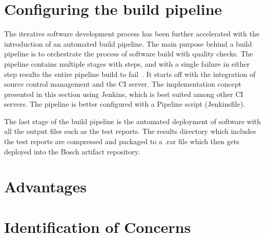 \section{Configuring the build pipeline}\label{section:CICDpipeline}

The iterative software development process has been further accelerated  with the introduction of an automated build pipeline. The main purpose behind a build pipeline is to orchestrate the process of software build with quality checks. The pipeline contains multiple stages with steps, and with a single failure in either step results the entire pipeline build to fail~\parencite{soni2015end}.  It starts off with the integration of source control management and the CI server. The implementation concept presented in this section using Jenkins, which is best suited among other CI servers. The pipeline is better configured with a Pipeline script (Jenkinsfile).


The last stage of the build pipeline is the automated deployment of software with all the output files such as the test reports. The results directory which includes the test reports are compressed and packaged to a .rar file which then gets deployed into the Bosch artifact repository.



\section{Advantages}\label{section:AdvantagesCICDpipeline}


\section{Identification of Concerns}\label{section:ConcernsCICDpipeline}




\clearpage\null\thispagestyle{empty}